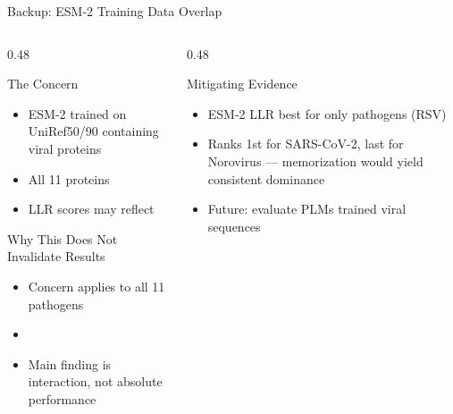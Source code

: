 \begin{frame}[noframenumbering]{Backup: ESM-2 Training Data Overlap}
  \footnotesize
  \begin{columns}[T]
    \begin{column}{0.48\textwidth}
      \begin{block}{The Concern}
        \begin{itemize}
          \item ESM-2 trained on UniRef50/90 containing viral proteins
          \item All 11 proteins 
          \item LLR scores may reflect 
        \end{itemize}
      \end{block}
      \begin{block}{Why This Does Not Invalidate Results}
        \begin{itemize}
          \item Concern applies  to all 11 pathogens
          \item {}
          \item Main finding is interaction, not absolute performance
        \end{itemize}
      \end{block}
    \end{column}
    \begin{column}{0.48\textwidth}
      \begin{block}{Mitigating Evidence}
        \begin{itemize}
          \item ESM-2 LLR best for only  pathogens (RSV)
          \item Ranks 1st for SARS-CoV-2, last for Norovirus --- memorization would yield consistent dominance
          \item Future: evaluate PLMs trained  viral sequences
        \end{itemize}
      \end{block}
    \end{column}
  \end{columns}
\end{frame}
